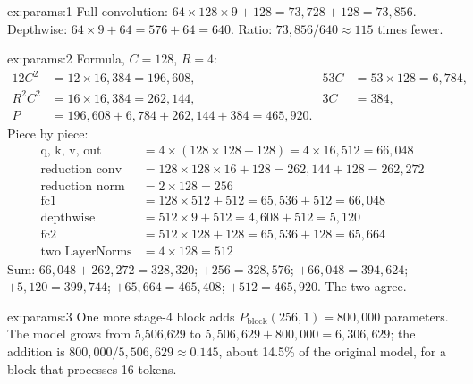 
\begin{solution}{ex:params:1}
Full convolution: $64 \times 128 \times 9 + 128 = 73{,}728 + 128 = 73{,}856$. Depthwise:
$64 \times 9 + 64 = 576 + 64 = 640$. Ratio: $73{,}856 / 640 \approx 115$ times fewer.
\end{solution}

\begin{solution}{ex:params:2}
Formula, $C = 128$, $R = 4$:
\begin{align*}
12 C^2 &= 12 \times 16{,}384 = 196{,}608, & 53 C &= 53 \times 128 = 6{,}784,\\
R^2 C^2 &= 16 \times 16{,}384 = 262{,}144, & 3C &= 384,\\
P &= 196{,}608 + 6{,}784 + 262{,}144 + 384 = 465{,}920 .
\end{align*}
Piece by piece:
\begin{align*}
\text{q, k, v, out} &= 4 \times (128 \times 128 + 128) = 4 \times 16{,}512 = 66{,}048\\
\text{reduction conv} &= 128 \times 128 \times 16 + 128 = 262{,}144 + 128 = 262{,}272\\
\text{reduction norm} &= 2 \times 128 = 256\\
\text{fc1} &= 128 \times 512 + 512 = 65{,}536 + 512 = 66{,}048\\
\text{depthwise} &= 512 \times 9 + 512 = 4{,}608 + 512 = 5{,}120\\
\text{fc2} &= 512 \times 128 + 128 = 65{,}536 + 128 = 65{,}664\\
\text{two LayerNorms} &= 4 \times 128 = 512
\end{align*}
Sum: $66{,}048 + 262{,}272 = 328{,}320$; $+ 256 = 328{,}576$; $+ 66{,}048 = 394{,}624$; $+ 5{,}120 =
399{,}744$; $+ 65{,}664 = 465{,}408$; $+ 512 = 465{,}920$. The two agree.
\end{solution}

\begin{solution}{ex:params:3}
One more stage-4 block adds $P_{\text{block}}(256, 1) = 800{,}000$ parameters. The model grows from
5,506,629 to $5{,}506{,}629 + 800{,}000 = 6{,}306{,}629$; the addition is $800{,}000 / 5{,}506{,}629
\approx 0.145$, about 14.5\% of the original model, for a block that processes 16 tokens.
\end{solution}

